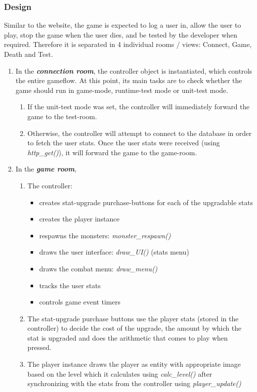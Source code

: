 \documentclass[12pt]{report}
\begin{document}
\subsubsection{Design}
Similar to the website, the game is expected to log a user in, allow the user to play, stop the game when the user dies, and be tested by the developer when required. Therefore it is separated in 4 individual rooms / views: Connect, Game, Death and Test.
\begin{enumerate}
\item In the \emph{\textbf{connection room}}, the controller object is instantiated, which controls the entire gameflow. At this point, its main tasks are to check whether the game should run in game-mode, runtime-test mode or unit-test mode.
\begin{enumerate}
\item If the unit-test mode was set, the controller will immediately forward the game to the test-room.
\item Otherwise, the controller will attempt to connect to the database in order to fetch the user stats. Once the user stats were received (using \textsl{http\_get()}), it will forward the game to the game-room.
\end{enumerate} 
\item In the \emph{\textbf{game room}}, 
\begin{enumerate}
\item The controller: 
\begin{itemize}
\item creates stat-upgrade purchase-buttons for each of the upgradable stats
\item creates the player instance
\item respawns the monsters: \textsl{monster\_respawn()}
\item draws the user interface: \textsl{draw\_UI()} (stats menu)
\item draws the combat menu: \textsl{draw\_menu()}
\item tracks the user stats
\item controls game event timers
\end{itemize}  
\item The stat-upgrade purchase buttons use the player stats (stored in the controller) to decide the cost of the upgrade, the amount by which the stat is upgraded and does the arithmetic that comes to play when pressed.
\item The player instance draws the player as entity with appropriate image based on the level which it calculates using \textsl{calc\_level()} after synchronizing with the stats from the controller using \textsl{player\_update()}

\end{enumerate}
\end{enumerate}
\end{document}
